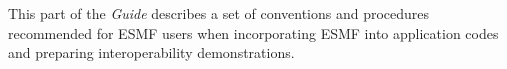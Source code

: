 
This part of the {\it Guide} describes a set of conventions and
procedures recommended for ESMF users when incorporating
ESMF into application codes and preparing interoperability 
demonstrations.





